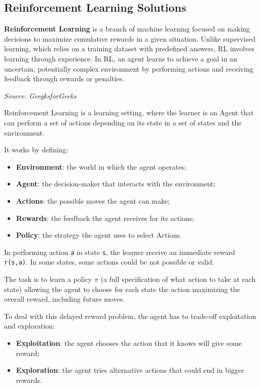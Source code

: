 \subsection{Reinforcement Learning Solutions}
\begin{blockquote}
  \textbf{Reinforcement Learning} is a branch of machine learning focused on
  making decisions to maximize cumulative rewards in a given situation. Unlike supervised
  learning, which relies on a training dataset with predefined answers, RL involves
  learning through experience. In RL, an agent learns to achieve a goal in an uncertain,
  potentially complex environment by performing actions and receiving feedback
  through rewards or penalties.

  \emph{Source: GeegksforGeeks \footnotemark}
\end{blockquote}

Reinforcement Learning is a learning setting, where the learner is an Agent that
can perform a set of actions depending on its state in a set of states and the
environment.

It works by defining:
\begin{itemize}
  \item \textbf{Environment}: the world in which the agent operates;

  \item \textbf{Agent}: the decision-maker that interacts with the environment;

  \item \textbf{Actions}: the possible moves the agent can make;

  \item \textbf{Rewards}: the feedback the agent receives for its actions;

  \item \textbf{Policy}: the strategy the agent uses to select Actions.
\end{itemize}

In performing action \texttt{a} in state \texttt{s}, the learner receive an immediate
reward \texttt{r(s,a)}. In some states, some actions could be not possible or
valid.

The task is to learn a policy $\pi$ (a full specification of what action to take
at each state) allowing the agent to choose for each state the action maximizing
the overall reward, including future moves.

To deal with this delayed reward problem, the agent has to trade-off
exploitation and exploration:
\begin{itemize}
  \item \textbf{Exploitation}: the agent chooses the action that it knows will give
    some reward;

  \item \textbf{Exploration}: the agent tries alternative actions that could end
    in bigger rewards.
\end{itemize}

